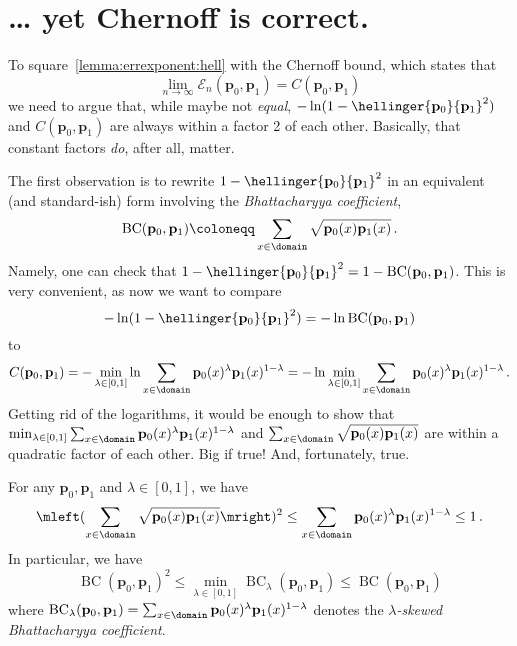 \documentclass[10pt]{article}
\renewcommand{\eqdef}{\coloneqq}
\newcommand{\p}{\mathbf{p}}
\newcommand{\ns}{n}
\newcommand{\errexp}{\mathcal{E}}
\begin{document}
\section{\dots{} yet Chernoff is correct.}
To square~\autoref{lemma:errexponent:hell} with the Chernoff bound, which states that
\begin{equation}
	\lim_{\ns\to \infty}\errexp_\ns(\p_0,\p_1) = C(\p_0,\p_1)
\end{equation}
we need to argue that, while maybe not \emph{equal}, $-\ln(1-\hellinger{\p_0}{\p_1}^2)$ and $C(\p_0,\p_1)$ are always within a factor 2 of each other. Basically, that constant factors \emph{do}, after all, matter.

The first observation is to rewrite $1-\hellinger{\p_0}{\p_1}^2$ in an equivalent (and standard-ish) form involving the \emph{Bhattacharyya coefficient},
\begin{equation}
	\operatorname{BC}(\p_0,\p_1) \eqdef \sum_{x\in\domain} \sqrt{\p_0(x) \p_1(x)}\,.
\end{equation}
Namely, one can check that 
$
1-\hellinger{\p_0}{\p_1}^2 = 1 - \operatorname{BC}(\p_0,\p_1)$. This is very convenient, as now we want to compare
\[
	-\ln(1-\hellinger{\p_0}{\p_1}^2)
	= -\ln \operatorname{BC}(\p_0,\p_1)
\]
to
\[
	C(\p_0,\p_1) 
	= -\min_{\lambda\in[0,1]} \ln \sum_{x\in\domain} \p_0(x)^\lambda\p_1(x)^{1-\lambda} 
	= - \ln  \min_{\lambda\in[0,1]} \sum_{x\in\domain} \p_0(x)^\lambda\p_1(x)^{1-\lambda}\,. 
\]
Getting rid of the logarithms, it would be enough to show that 
$\min_{\lambda\in[0,1]} \sum_{x\in\domain} \p_0(x)^\lambda\p_1(x)^{1-\lambda}$
and 
$
\sum_{x\in\domain} \sqrt{\p_0(x) \p_1(x)}
$
are within a quadratic factor of each other. Big if true! And, fortunately, true. 
\begin{lemma}
	\label{lemma:bhattacharyya}
For any $\p_0,\p_1$ and $\lambda\in[0,1]$, we have
\begin{equation}
		\mleft(\sum_{x\in\domain} \sqrt{\p_0(x) \p_1(x)}\mright)^2 \leq \sum_{x\in\domain} \p_0(x)^\lambda\p_1(x)^{1-\lambda} \leq 1\,.
\end{equation}
In particular, we have
\begin{equation}
\operatorname{BC}(\p_0,\p_1)^2 \leq \min_{\lambda\in[0,1]} \operatorname{BC}_\lambda(\p_0,\p_1) \leq \operatorname{BC}(\p_0,\p_1)
\end{equation}
where $\operatorname{BC}_\lambda(\p_0,\p_1) = \sum_{x\in\domain} \p_0(x)^\lambda\p_1(x)^{1-\lambda}$ denotes the \emph{$\lambda$-skewed Bhattacharyya coefficient}.
\end{lemma}
\end{document}
